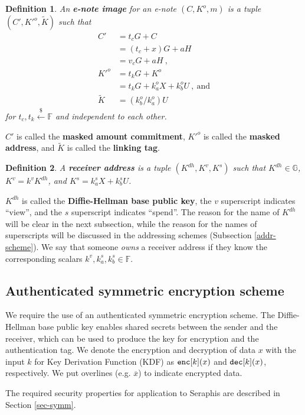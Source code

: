 \documentclass{article}
\newtheorem{definition}{Definition}[section]
\begin{document}
\begin{definition}\label{e-note-img}
An \textbf{\em e-note image} for an e-note $(C, K^o, m)$ is a tuple $(C', K'^o, \tilde{K})$ such that
\begin{align*}
C' &= t_c G + C \\ &= (t_c+x)G + aH \\ &= v_c G + aH \ , \\
K'^o &= t_k G + K^o \\ &= t_k G + k_a^o X + k_b^o U \ ,\ \text{and} \\
\tilde{K} &= (k_b^o/k_a^o)U
\end{align*}
for $t_c, t_k \xleftarrow{\$}\mathbb{F}$ and independent to each other.
\end{definition}
$C'$ is called the \textbf{masked amount commitment}, $K'^o$ is called the \textbf{masked address}, and $\tilde{K}$ is called the \textbf{linking tag}.

\begin{definition}\label{recv-addr}
A \textbf{\em receiver address} is a tuple $(K^{dh}, K^v, K^s)$  such that $K^{dh}\in\mathbb{G}$, $K^v = k^v K^{dh}$, and $K^s = k_a^s X + k_b^s U$.
\end{definition}
$K^{dh}$ is called the \textbf{Diffie-Hellman base public key}, the $v$ superscript indicates ``view'', and the $s$ superscript indicates ``spend''. The reason for the name of $K^{dh}$ will be clear in the next subsection, while the reason for the names of superscripts will be discussed in the addressing schemes (Subsection \ref{addr-scheme}). We say that someone \textit{owns} a receiver address if they know the corresponding scalars $k^v, k_a^s, k_b^s \in\mathbb{F}$.

\subsection{Authenticated symmetric encryption scheme}
We require the use of an authenticated symmetric encryption scheme. The Diffie-Hellman base public key enables shared secrets between the sender and the receiver, which can be used to produce the key for encryption and the authentication tag. We denote the encryption and decryption of data $x$ with the input $k$ for Key Derivation Function (KDF) as ${\tt enc}[k](x)$ and ${\tt dec}[k](x)$, respectively. We put overlines (e.g. $\overline{x}$) to indicate encrypted data.

The required security properties for application to Seraphis are described in Section \ref{sec-symm}.
\end{document}
